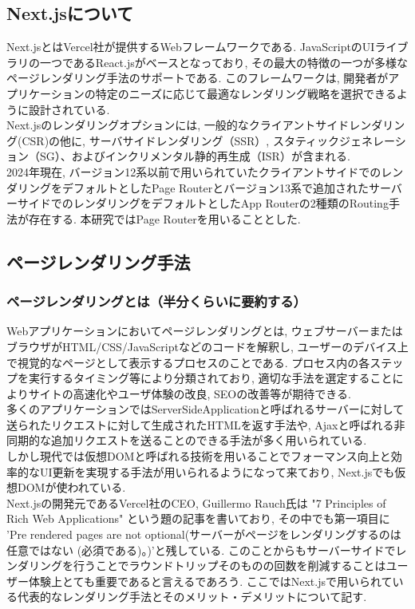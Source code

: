 \subsection{Next.jsについて}
Next.jsとはVercel社が提供するWebフレームワークである.
JavaScriptのUIライブラリの一つであるReact.jsがベースとなっており, その最大の特徴の一つが多様なページレンダリング手法のサポートである.
このフレームワークは, 開発者がアプリケーションの特定のニーズに応じて最適なレンダリング戦略を選択できるように設計されている. \\
Next.jsのレンダリングオプションには, 一般的なクライアントサイドレンダリング(CSR)の他に, サーバサイドレンダリング（SSR）, スタティックジェネレーション（SG）、およびインクリメンタル静的再生成（ISR）が含まれる.\\
2024年現在, バージョン12系以前で用いられていたクライアントサイドでのレンダリングをデフォルトとしたPage Routerとバージョン13系で追加されたサーバーサイドでのレンダリングをデフォルトとしたApp Routerの2種類のRouting手法が存在する.
本研究ではPage Routerを用いることとした.

\subsection{ページレンダリング手法}
\subsubsection{ページレンダリングとは（半分くらいに要約する）}
Webアプリケーションにおいてページレンダリングとは, ウェブサーバーまたはブラウザがHTML/CSS/JavaScriptなどのコードを解釈し, ユーザーのデバイス上で視覚的なページとして表示するプロセスのことである.
プロセス内の各ステップを実行するタイミング等により分類されており, 適切な手法を選定することによりサイトの高速化やユーザ体験の改良, SEOの改善等が期待できる.\\
多くのアプリケーションではServerSideApplicationと呼ばれるサーバーに対して送られたリクエストに対して生成されたHTMLを返す手法や, Ajaxと呼ばれる非同期的な追加リクエストを送ることのできる手法が多く用いられている.\\
しかし現代では仮想DOMと呼ばれる技術を用いることでフォーマンス向上と効率的なUI更新を実現する手法が用いられるようになって来ており, Next.jsでも仮想DOMが使われている.\\
Next.jsの開発元であるVercel社のCEO, Guillermo Rauch氏は "7 Principles of Rich Web Applications" という題の記事を書いており, その中でも第一項目に 'Pre rendered pages are not optional(サーバーがページをレンダリングするのは任意ではない (必須である)。)'と残している. 
このことからもサーバーサイドでレンダリングを行うことでラウンドトリップそのものの回数を削減することはユーザー体験上とても重要であると言えるであろう.
ここではNext.jsで用いられている代表的なレンダリング手法とそのメリット・デメリットについて記す.

